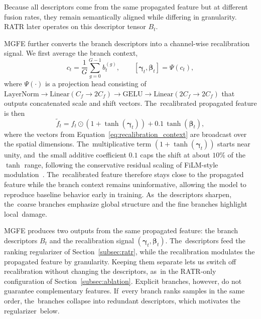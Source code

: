 \documentclass[symmetry,article,accept,pdftex,moreauthors]{Definitions/mdpi}
\begin{document}
Because all descriptors come from the same propagated feature but at different fusion rates, they remain semantically aligned while differing in granularity. RATR later operates on this descriptor tensor $B_t$.

MGFE further converts the branch descriptors into a channel-wise recalibration signal. We first average the branch context,
\begin{equation}
c_t = \frac{1}{G}\sum_{g=0}^{G-1}b_t^{(g)},
\qquad
[\boldsymbol{\gamma}_t,\boldsymbol{\beta}_t] = \Psi(c_t),
\label{eq:recalibration_context}
\end{equation}
where $\Psi(\cdot)$ is a projection head consisting of $\mathrm{LayerNorm}\!\rightarrow\!\mathrm{Linear}(C_f\!\rightarrow\!2C_f)\!\rightarrow\!\mathrm{GELU}\!\rightarrow\!\mathrm{Linear}(2C_f\!\rightarrow\!2C_f)$ that outputs concatenated scale and shift vectors. The~recalibrated propagated feature is then
\begin{equation}
\widetilde{f}_t =
f_t \odot
\left(1+\tanh(\boldsymbol{\gamma}_t)\right)
+ 0.1\,\tanh(\boldsymbol{\beta}_t),
\label{eq:recalibration}
\end{equation}
where the vectors from Equation~\eqref{eq:recalibration_context} are broadcast over the spatial dimensions. The~multiplicative term $(1+\tanh(\boldsymbol{\gamma}_t))$ starts near unity, and~the small additive coefficient $0.1$ caps the shift at about $10\%$ of the $\tanh$ range, following the conservative residual scaling of FiLM-style modulation~\cite{perez2018film}. The~recalibrated feature therefore stays close to the propagated feature while the branch context remains uninformative, allowing the model to reproduce baseline behavior early in training. As~the descriptors sharpen, the~coarse branches emphasize global structure and the fine branches highlight local~damage.

MGFE produces two outputs from the same propagated feature: the branch descriptors $B_t$ and the recalibration signal $(\boldsymbol{\gamma}_t, \boldsymbol{\beta}_t)$. The~descriptors feed the ranking regularizer of Section~\ref{subsec:ratr}, while the recalibration modulates the propagated feature by granularity. Keeping them separate lets us switch off recalibration without changing the descriptors, as~in the RATR-only configuration of Section~\ref{subsec:ablation}. Explicit branches, however, do not guarantee complementary features. If~every branch ranks samples in the same order, the~branches collapse into redundant descriptors, which motivates the regularizer~below.
\end{document}
